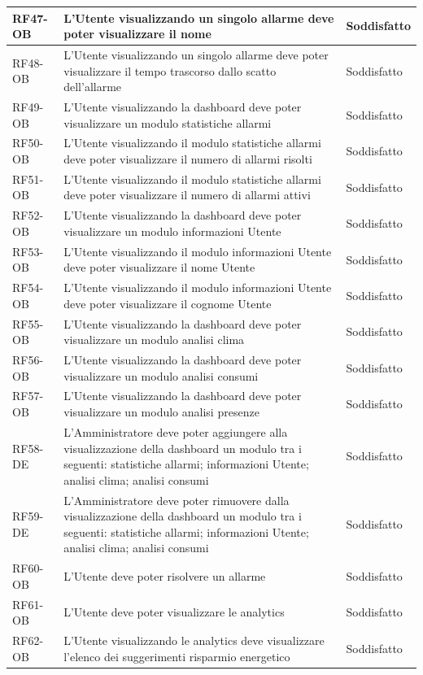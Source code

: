 \begin{longtable}{|p{2.5cm}|p{9cm}|p{3cm}|}
\hline
RF47-OB & L'Utente visualizzando un singolo allarme deve poter visualizzare il nome & Soddisfatto \\
\hline
RF48-OB & L'Utente visualizzando un singolo allarme deve poter visualizzare il tempo trascorso dallo scatto dell'allarme & Soddisfatto \\
\hline
RF49-OB & L'Utente visualizzando la dashboard deve poter visualizzare un modulo statistiche allarmi & Soddisfatto \\
\hline
RF50-OB & L'Utente visualizzando il modulo statistiche allarmi deve poter visualizzare il numero di allarmi risolti & Soddisfatto \\
\hline
RF51-OB & L'Utente visualizzando il modulo statistiche allarmi deve poter visualizzare il numero di allarmi attivi & Soddisfatto \\
\hline
RF52-OB & L'Utente visualizzando la dashboard deve poter visualizzare un modulo informazioni Utente & Soddisfatto \\
\hline
RF53-OB & L'Utente visualizzando il modulo informazioni Utente deve poter visualizzare il nome Utente & Soddisfatto \\
\hline
RF54-OB & L'Utente visualizzando il modulo informazioni Utente deve poter visualizzare il cognome Utente & Soddisfatto \\
\hline
RF55-OB & L'Utente visualizzando la dashboard deve poter visualizzare un modulo analisi clima & Soddisfatto \\
\hline
RF56-OB & L'Utente visualizzando la dashboard deve poter visualizzare un modulo analisi consumi & Soddisfatto \\
\hline
RF57-OB & L'Utente visualizzando la dashboard deve poter visualizzare un modulo analisi presenze & Soddisfatto \\
\hline
RF58-DE & L'Amministratore deve poter aggiungere alla visualizzazione della dashboard un modulo tra i seguenti: statistiche allarmi; informazioni Utente; analisi clima; analisi consumi & Soddisfatto \\
\hline
RF59-DE & L'Amministratore deve poter rimuovere dalla visualizzazione della dashboard un modulo tra i seguenti: statistiche allarmi; informazioni Utente; analisi clima; analisi consumi & Soddisfatto \\
\hline
RF60-OB & L'Utente deve poter risolvere un allarme & Soddisfatto \\
\hline
RF61-OB & L'Utente deve poter visualizzare le analytics & Soddisfatto \\
\hline
RF62-OB & L'Utente visualizzando le analytics deve visualizzare l'elenco dei suggerimenti risparmio energetico & Soddisfatto \\

\end{longtable}
